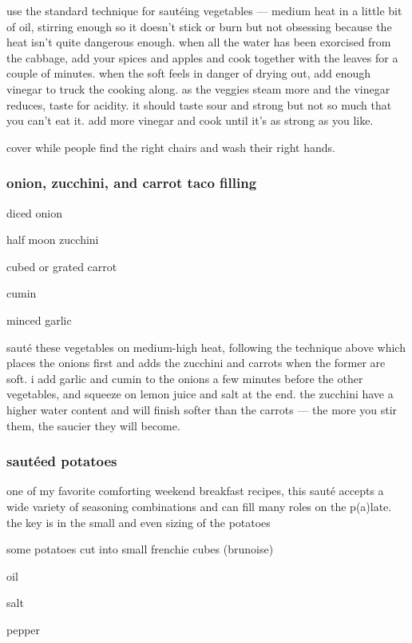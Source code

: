 use the standard technique for saut\'{e}ing vegetables --- medium heat in a 
little bit of oil, stirring enough so it doesn't stick or burn but not 
obsessing because the heat isn't quite dangerous enough. when all the water 
has been exorcised from the cabbage, add your spices and apples and cook 
together with the leaves for a couple of minutes. when the soft feels in 
danger of drying out, add enough vinegar to truck the cooking along. as the 
veggies steam more and the vinegar reduces, taste for acidity. it should taste 
sour and strong but not so much that you can't eat it. add more vinegar and 
cook until it's as strong as you like.

cover while people find the right chairs and wash their right hands.

\subsubsection{onion, zucchini, and carrot taco filling}

\begin{ingredients}
  \item diced onion
  \item half moon zucchini
  \item cubed or grated carrot
  \item cumin
  \item minced garlic
\end{ingredients}

saut\'{e} these vegetables on medium-high heat, following the technique above 
which places the onions first and adds the zucchini and carrots when the 
former are soft. i add garlic and cumin to the onions a few minutes before the 
other vegetables, and squeeze on lemon juice and salt at the end. the zucchini 
have a higher water content and will finish softer than the carrots --- the 
more you stir them, the saucier they will become.

\subsubsection{saut\'{e}ed potatoes}

one of my favorite comforting weekend breakfast recipes, this saut\'{e} 
accepts a wide variety of seasoning combinations and can fill many roles on 
the p(a)late. the key is in the small and even sizing of the potatoes

\begin{ingredients}
  \item some potatoes cut into small frenchie cubes (brunoise)
  \item oil
  \item salt
  \item pepper
\end{ingredients}

